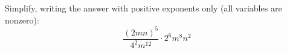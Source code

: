 Simplify, writing the answer with positive exponents only (all variables are nonzero):
\[
\dfrac{(2mn)^5}{4^2m^{12}}\cdot2^6m^8n^2
\]
